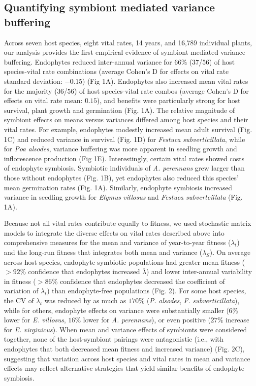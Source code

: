 \documentclass[9pt,twocolumn,twoside]{pnas-new}
\begin{document}
\subsection*{Quantifying symbiont mediated variance buffering}
Across seven host species, eight vital rates, 14 years, and 16,789 individual plants, our analysis provides the first empirical evidence of symbiont-mediated variance buffering. 
Endophytes reduced inter-annual variance for 66\% ($37$/$56$) of host species-vital rate combinations (average Cohen's D for effects on vital rate standard deviation: $-0.15$) (Fig 1A). 
Endophytes also increased mean vital rates for the majority ($36$/$56$) of host species-vital rate combos (average Cohen's D for effects on vital rate mean: $0.15$), and benefits were particularly strong for host survival, plant growth and germination (Fig. 1A).
The relative magnitude of symbiont effects on means versus variances differed among host species and their vital rates.
For example, endophytes modestly increased mean adult survival (Fig. 1C) and reduced variance in survival (Fig. 1D) for \emph{Festuca subverticillata}, while for \emph{Poa alsodes}, variance buffering was more apparent in seedling growth and inflorescence production (Fig 1E). 
Interestingly, certain vital rates showed costs of endophyte symbiosis. 
Symbiotic individuals of \emph{A. perennans} grew larger than those without endophytes (Fig. 1B), yet endophytes also reduced this species' mean germination rates (Fig. 1A). 
Similarly, endophyte symbiosis increased variance in seedling growth for \emph{Elymus villosus} and \emph{Festuca subvertcillata} (Fig. 1A).


Because not all vital rates contribute equally to fitness, we used stochastic matrix models to integrate the diverse effects on vital rates described above into comprehensive measures for the mean and variance of year-to-year fitness ($\lambda_{t}$) and the long-run fitness that integrates both mean and variance ($\lambda_{S}$). 
On average across host species, endophyte-symbiotic populations had greater mean fitness ($>92$\% confidence that endophytes increased $\overline{\lambda}$) and lower inter-annual variability in fitness ($>86$\% confidence that endophytes decreased the coefficient of variation of $\lambda_{t}$) than endophyte-free populations (Fig. 2).
For some host species, the CV of $\lambda_{t}$ was reduced by as much as $170$\% (\emph{P. alsodes}, \emph{F. subverticillata}), while for others, endophyte effects on variance were substantially smaller ($6$\% lower for \emph{E. villosus}, $16$\% lower for \emph{A. perennans}), or even positive ($27$\% increase for \emph{E. virginicus}).
When mean and variance effects of symbionts were considered together, none of the host-symbiont pairings were antagonistic (i.e., with endophytes that both decreased mean fitness and increased variance) (Fig. 2C), suggesting that variation across host species and vital rates in mean and variance effects may reflect alternative strategies that yield similar benefits of endophyte symbiosis.
\end{document}
